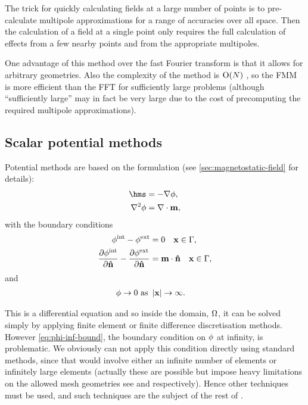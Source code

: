 The trick for quickly calculating fields at a large number of points is to pre-calculate multipole approximations for a range of accuracies over all space.
Then the calculation of a field at a single point only requires the full calculation of effects from a few nearby points and from the appropriate multipoles.

One advantage of this method over the fast Fourier transform is that it allows for arbitrary geometries.
Also the complexity of the method is $\text{O}{\left( N \right)}$ \cite{Chang2011}, so the FMM is more efficient than the FFT for sufficiently large problems (although ``sufficiently large'' may in fact be very large due to the cost of precomputing the required multipole approximations).


\subsection{Scalar potential methods}
\label{sec:magstat-field-calc-pote}

Potential methods are based on the formulation (see \cref{sec:magnetostatic-field} for details):
\begin{equation}
  \begin{aligned}
    \label{eq:Hms2}
    \hms &= - \nabla \phim, \\
    \lap \phim &= \nabla \cdot \mv,
  \end{aligned}
\end{equation}
with the boundary conditions
\begin{equation}
  \begin{aligned}
    \label{eq:cont-phi-bound2}
    \phi^{\text{int}} - \phi^{\text{ext}} &= 0 \quad \mathbf{x} \in {\Gamma}, \\
    \frac{\partial \phi^{\text{int}}}{\partial \mathbf{\hat{n}}} - \frac{\partial \phi^{\text{ext}}}{\partial \mathbf{\hat{n}}} &= \mathbf{m} \cdot \mathbf{\hat{n}} \quad \mathbf{x} \in {\Gamma}, \\
  \end{aligned}
\end{equation}
and
\begin{equation}
  \begin{aligned}
    \label{eq:phi-inf-bound}
    \phi \rightarrow 0 \text{ as } &\left|{\mathbf{x}} \right| \rightarrow \infty.
  \end{aligned}
\end{equation}

This is a differential equation and so inside the domain, $\Omega$, it can be solved simply by applying finite element or finite difference discretisation methods.
However \cref{eq:phi-inf-bound}, the boundary condition on $\phi$ at infinity, is problematic.
We obviously can not apply this condition directly using standard methods, since that would involve either an infinite number of elements or infinitely large elements (actually these are  possible but impose heavy limitations on the allowed mesh geometries see \eg \cite{Alouges2001} and \cite{Fidler2000} respectively).
Hence other techniques must be used, and such techniques are the subject of the rest of .

